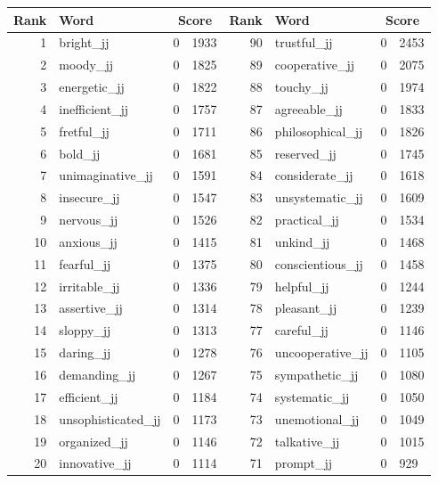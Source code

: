 \begin{table}[tbp]
    \begin{tabular}{| rlr@{.}l | rlr@{.}l |}
    \hline
    \textbf{Rank} & \textbf{Word} & \multicolumn{2}{c|}{\textbf{Score}} & \textbf{Rank} & \textbf{Word} & \multicolumn{2}{c|}{\textbf{Score}} \\
    \hline
    1 & bright\_jj & 0 & 1933    &    90 & trustful\_jj & 0 & 2453 \\
    2 & moody\_jj & 0 & 1825    &    89 & cooperative\_jj & 0 & 2075 \\
    3 & energetic\_jj & 0 & 1822    &    88 & touchy\_jj & 0 & 1974 \\
    4 & inefficient\_jj & 0 & 1757    &    87 & agreeable\_jj & 0 & 1833 \\
    5 & fretful\_jj & 0 & 1711    &    86 & philosophical\_jj & 0 & 1826 \\
    6 & bold\_jj & 0 & 1681    &    85 & reserved\_jj & 0 & 1745 \\
    7 & unimaginative\_jj & 0 & 1591    &    84 & considerate\_jj & 0 & 1618 \\
    8 & insecure\_jj & 0 & 1547    &    83 & unsystematic\_jj & 0 & 1609 \\
    9 & nervous\_jj & 0 & 1526    &    82 & practical\_jj & 0 & 1534 \\
    10 & anxious\_jj & 0 & 1415    &    81 & unkind\_jj & 0 & 1468 \\
    11 & fearful\_jj & 0 & 1375    &    80 & conscientious\_jj & 0 & 1458 \\
    12 & irritable\_jj & 0 & 1336    &    79 & helpful\_jj & 0 & 1244 \\
    13 & assertive\_jj & 0 & 1314    &    78 & pleasant\_jj & 0 & 1239 \\
    14 & sloppy\_jj & 0 & 1313    &    77 & careful\_jj & 0 & 1146 \\
    15 & daring\_jj & 0 & 1278    &    76 & uncooperative\_jj & 0 & 1105 \\
    16 & demanding\_jj & 0 & 1267    &    75 & sympathetic\_jj & 0 & 1080 \\
    17 & efficient\_jj & 0 & 1184    &    74 & systematic\_jj & 0 & 1050 \\
    18 & unsophisticated\_jj & 0 & 1173    &    73 & unemotional\_jj & 0 & 1049 \\
    19 & organized\_jj & 0 & 1146    &    72 & talkative\_jj & 0 & 1015 \\
    20 & innovative\_jj & 0 & 1114    &    71 & prompt\_jj & 0 & 929 \\

\end{tabular}
\end{table}
